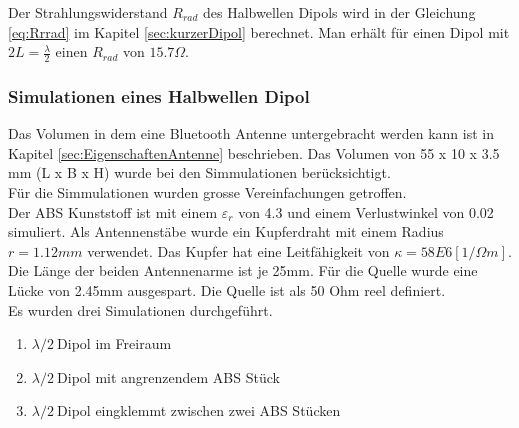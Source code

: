 Der Strahlungswiderstand $R_{rad}$ des Halbwellen Dipols wird in der Gleichung \ref{eq:Rrrad} im Kapitel \ref{sec:kurzerDipol} berechnet. Man erhält für einen Dipol mit $2L = \frac{\lambda}{2}$ einen $R_{rad}$ von $15.7 \Omega $.

\newpage
\subsubsection{Simulationen eines Halbwellen Dipol}

Das Volumen in dem eine Bluetooth Antenne untergebracht werden kann ist in Kapitel \ref{sec:EigenschaftenAntenne} beschrieben. Das Volumen von 55 x 10 x 3.5 mm (L x B x H) wurde bei den Simmulationen berücksichtigt. \\
Für die Simmulationen wurden grosse Vereinfachungen getroffen.\\
Der ABS Kunststoff ist mit einem $\varepsilon_r $ von 4.3 und einem Verlustwinkel von 0.02 simuliert. Als Antennenstäbe wurde ein  Kupferdraht mit einem Radius $r = 1.12 mm$ verwendet. Das Kupfer hat eine Leitfähigkeit von $\kappa=58E6 [1/\Omega m]$. Die Länge der beiden Antennenarme ist je 25mm. Für die Quelle wurde eine Lücke von 2.45mm ausgespart. Die Quelle ist als 50 Ohm reel definiert.\\ 
Es wurden drei Simulationen durchgeführt.
\begin{enumerate}
\item  $\lambda/2 \ $Dipol im Freiraum
\item  $\lambda/2 \ $Dipol mit angrenzendem ABS Stück
\item  $\lambda/2 \ $Dipol eingklemmt zwischen zwei ABS Stücken
\end{enumerate}

